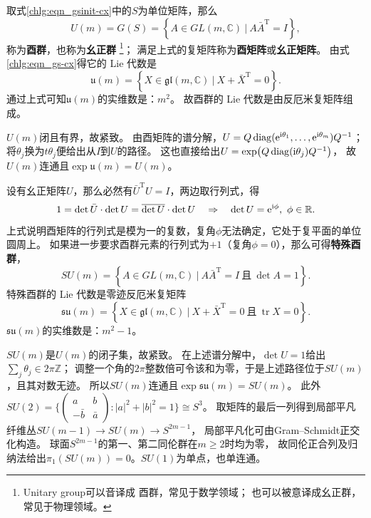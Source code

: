 取式\eqref{chlg:eqn_gsinit-cx}中的$S$为单位矩阵，那么
\begin{equation}\label{chlg:eqn_unitary}
    U(m)=G(S)= \left\{ A \in GL(m,\mathbb{C})\ |\ A \bar{A}^{\mathrm{T}} =I \right\},
\end{equation}
称为\textbf{酉群}，也称为\textbf{幺正群}
\footnote{Unitary group可以音译成 {酉群}，常见于数学领域；
    也可以被意译成{幺正群}，常见于物理领域。}；
满足上式的复矩阵称为\textbf{酉矩阵}或\textbf{幺正矩阵}。
由式\eqref{chlg:eqn_gs-cx}得它的 Lie 代数是
\begin{equation}
    \mathfrak{u}(m)= \left\{ X \in
    \mathfrak{gl}(m,\mathbb{C})\ |\ X  + \bar{X}^{\mathrm{T}} =0 \right\}.
\end{equation}
通过上式可知$\mathfrak{u}(m)$的实维数是：$m^2$。
故酉群的 Lie 代数是由反厄米复矩阵组成。

$U(m)$闭且有界，故紧致。
由酉矩阵的谱分解，$U=Q\operatorname{diag}(\mathrm{e}^{\mathrm{i}\theta_1},\ldots,\mathrm{e}^{\mathrm{i}\theta_m})Q^{-1}$；
将$\theta_j$换为$t\theta_j$便给出从$I$到$U$的路径。
这也直接给出$U=\exp(Q\operatorname{diag}(\mathrm{i}\theta_j)Q^{-1})$，
故$U(m)$连通且$\exp\mathfrak u(m)=U(m)$。

设有幺正矩阵$U$，那么必然有$\bar{U}^{\mathrm{T}} U = I$，两边取行列式，得
\begin{equation}
    1 = \det\bar{U}\cdot \det U =\overline{\det U} \cdot \det U
    \quad \Rightarrow \quad  \det U = \mathrm{e}^{\mathrm{i} \phi}, \ \phi\in \mathbb{R} .
\end{equation}
上式说明酉矩阵的行列式是模为一的复数，复角$\phi$无法确定，它处于复平面的单位圆周上。
如果进一步要求酉群元素的行列式为$+1$（复角$\phi=0$），那么可得\textbf{特殊酉群}，
\begin{equation}
    SU(m)=
    \left\{ A \in GL(m,\mathbb{C})\ |\ A \bar{A}^{\mathrm{T}} =I \ \text{且} \  \det A=1 \right\}.
\end{equation}
特殊酉群的 Lie 代数是零迹反厄米复矩阵
\begin{equation}
    \mathfrak{su}(m)
    =\left\{X\in\mathfrak{gl}(m,\mathbb{C})\ |\ X+\bar{X}^{\mathrm{T}}=0
    \ \text{且} \  \operatorname{tr} X =0 \right\} .
\end{equation}
$\mathfrak{su}(m)$的实维数是：$m^2-1$。

$SU(m)$是$U(m)$的闭子集，故紧致。
在上述谱分解中，$\det U=1$给出$\sum_j\theta_j\in2\pi\mathbb Z$；
调整一个角的$2\pi$整数倍可令该和为零，于是上述路径位于$SU(m)$，且其对数无迹。
所以$SU(m)$连通且$\exp\mathfrak{su}(m)=SU(m)$。
此外$SU(2)=\{\left(\begin{smallmatrix}a&b\\-\bar b&\bar a\end{smallmatrix}\right):|a|^2+|b|^2=1\}\cong S^3$。
取矩阵的最后一列得到局部平凡纤维丛$SU(m-1)\to SU(m)\to S^{2m-1}$，
局部平凡化可由Gram--Schmidt正交化构造。
球面$S^{2m-1}$的第一、第二同伦群在$m\geqslant2$时均为零，
故同伦正合列及归纳法给出$\pi_1(SU(m))=0$。$SU(1)$为单点，也单连通。

